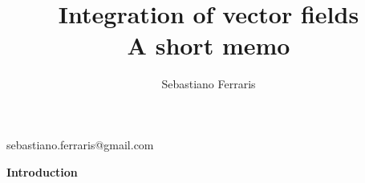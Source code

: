 \documentclass{ClassNotes}
\begin{document}
\title{Integration of vector fields \\ A short memo}

\IssueDue

\author{Sebastiano Ferraris}{sebastiano.ferraris@gmail.com}


\maketitle

\begin{center}
 {\bf Introduction}
\end{center}



\Body %




\clearpage
\pagestyle{empty}

 \tableofcontents

\clearpage


\pagestyle{fancy} 





















\end{document}
